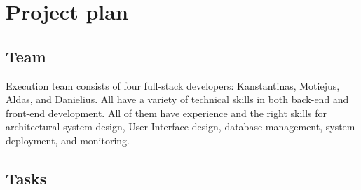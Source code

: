 \documentclass[
    english, %
]{VUMIFPSkursinis}
\begin{document}
\section{Project plan}

\subsection{Team}

Execution team consists of four full-stack developers: Kanstantinas, Motiejus, Aldas, and Danielius. All have a variety of technical skills in both back-end and front-end development. All of them have experience and the right skills for architectural system design, User Interface design, database management, system deployment, and monitoring.

\subsection{Tasks}
\end{document}
